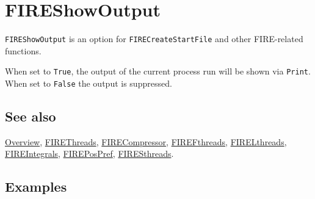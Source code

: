 \documentclass[../FeynHelpersManual.tex]{subfiles}
\begin{document}
\hypertarget{fireshowoutput}{
\section{FIREShowOutput}\label{fireshowoutput}}

\texttt{FIREShowOutput} is an option for \texttt{FIRECreateStartFile}
and other FIRE-related functions.

When set to \texttt{True}, the output of the current process run will be
shown via \texttt{Print}. When set to \texttt{False} the output is
suppressed.

\subsection{See also}

\hyperlink{toc}{Overview}, \hyperlink{firethreads}{FIREThreads},
\hyperlink{firecompressor}{FIRECompressor},
\hyperlink{firefthreads}{FIREFthreads},
\hyperlink{firelthreads}{FIRELthreads},
\hyperlink{fireintegrals}{FIREIntegrals},
\hyperlink{firepospref}{FIREPosPref},
\hyperlink{firesthreads}{FIRESthreads}.

\subsection{Examples}
\end{document}
